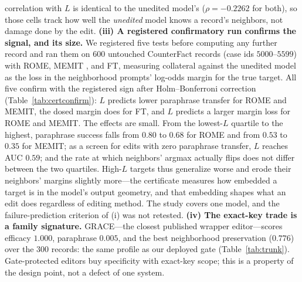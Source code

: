 \documentclass[11pt]{article}
\theoremstyle{remark}
\begin{document}
correlation with $L$ is identical to the unedited model's ($\rho=-0.2262$ for
both), so those cells track how well the \emph{unedited} model knows a
record's neighbors, not damage done by the edit.
\textbf{(iii) A registered confirmatory run confirms the signal, and its
size.} We registered five tests before computing any further record and ran
them on $600$ untouched CounterFact records (case ids $5000$--$5599$) with
ROME, MEMIT \citep{meng2022memit}, and FT, measuring collateral against the
unedited model as the loss in the neighborhood prompts' log-odds margin for
the true target. All five confirm with the registered sign after
Holm--Bonferroni correction (Table~\ref{tab:certconfirm}): $L$ predicts lower
paraphrase transfer for ROME and MEMIT, the dosed margin does for FT, and $L$
predicts a larger margin loss for ROME and MEMIT. The effects are small. From
the lowest-$L$ quartile to the highest, paraphrase success falls from $0.80$
to $0.68$ for ROME and from $0.53$ to $0.35$ for MEMIT; as a screen for edits
with zero paraphrase transfer, $L$ reaches AUC $0.59$; and the rate at which
neighbors' argmax actually flips does not differ between the two quartiles.
High-$L$ targets thus generalize worse and erode their neighbors' margins
slightly more---the certificate measures how embedded a target is in the
model's output geometry, and that embedding shapes what an edit does
regardless of editing method. The study covers one model, and the
failure-prediction criterion of (i) was not retested.
\textbf{(iv) The exact-key trade is a family signature.} GRACE---the closest
published wrapper editor---scores efficacy $1.000$, paraphrase $0.005$, and the
best neighborhood preservation ($0.776$) over the $300$ records: the same
profile as our deployed gate (Table~\ref{tab:trunk}). Gate-protected editors buy
specificity with exact-key scope; this is a property of the design point, not a
defect of one system.
\end{document}
